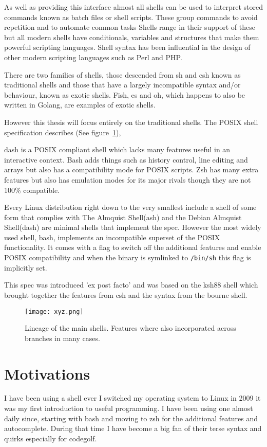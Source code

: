 As well as providing this interface almost all shells can be used to interpret stored commands known as batch files or shell scripts.
These group commands to avoid repetition and to automate common tasks
Shells range in their support of these but all modern shells have conditionals, variables and structures that make them powerful scripting languages.
Shell syntax has been influential in the design of other modern scripting languages such as Perl and PHP.

There are two families of shells, those descended from sh and csh known as traditional shells and those that have a largely incompatible syntax and/or behaviour, known as exotic shells.
Fish\cite{FISH}, es\cite{ES-SHELL} and oh\cite{OH-SHELL}, which happens to also be written in Golang, are examples of exotic shells.

However this thesis will focus entirely on the traditional shells.
The POSIX shell specification\cite{POSIX-SHELL-STANDARD} describes 
(See figure~\ref{fig:shell-history}),

dash is a POSIX compliant shell which lacks many features useful in an interactive context.
Bash adds things such as history control, line editing and arrays but also has a compatibility mode for POSIX scripts.
Zsh has many extra features but also has emulation modes for its major rivals though they are not 100\% compatible. 

Every Linux distribution right down to the very smallest\cite{ALPINE-LINUX} include a shell of some form that complies with 
The Almquist Shell(ash) and the Debian Almquist Shell(dash) are minimal shells that implement the spec.
However the most widely used shell, bash, implements an incompatible superset of the POSIX functionality.
It comes with a flag to switch off the additional features and enable POSIX compatibility and when the binary is symlinked to \verb!/bin/sh! this flag is implicitly set.

This spec was introduced 'ex post facto' and was based on the ksh88 shell which  brought together the features from csh and the syntax from the bourne shell.  

\begin{figure}[hp]
    \centering
    \texttt{[image: xyz.png]}
    \caption[Lineage of the main shells]{Lineage of the main shells\cite{SHELL-HISTORY}. Features where also incorporated across branches in many cases.}
    \label{fig:shell-history}
\end{figure}

\section{Motivations}
I have been using a shell ever I switched my operating system to Linux in 2009 it was my first introduction to useful programming.
I have been using one almost daily since, starting with bash and moving to zsh for the additional features and autocomplete.
During that time I have become a big fan of their terse syntax and quirks especially for codegolf\cite{CODE-GOLF}.

